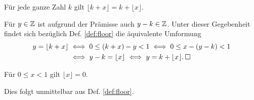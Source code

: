 \begin{Korollar}\label{floor-add-int}
Für jede ganze Zahl $k$ gilt $\lfloor k + x\rfloor = k + \lfloor x\rfloor$.
\end{Korollar}
\begin{Beweis} Für $y\in\mathbb Z$ ist aufgrund der Prämisse auch $y-k\in\mathbb Z$.
Unter dieser Gegebenheit findet sich bezüglich Def. \ref{def:floor}
die äquivalente Umformung
\begin{align*}
y = \lfloor k+x\rfloor &\iff 0\le (k+x)-y < 1\iff 0\le x-(y-k) < 1\\
&\iff y - k = \lfloor x\rfloor \iff y = k + \lfloor x\rfloor.\,\square
\end{align*}
\end{Beweis}

\begin{Korollar}\label{floor-is-zero}
Für $0\le x < 1$ gilt $\lfloor x\rfloor = 0$.
\end{Korollar}
\begin{Beweis}
Dies folgt unmittelbar aus Def. \ref{def:floor}.\,\qedsymbol
\end{Beweis}

